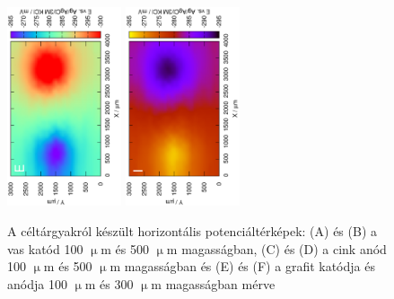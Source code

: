 \begin{figure}
\includegraphics[width=0.3\textwidth, angle=-90]{img/mérések/grafit_h1_100.eps}
\includegraphics[width=0.3\textwidth, angle=-90]{img/mérések/grafit_h_300.eps}
\caption{A céltárgyakról készült horizontális potenciáltérképek:
(A) és (B) a vas katód 100 $\upmu$m és 500 $\upmu$m magasságban, (C) és (D) a cink anód 100 $\upmu$m és 500 $\upmu$m magasságban és (E) és (F) a grafit katódja és anódja 100 $\upmu$m és 300 $\upmu$m magasságban mérve}
\label{fig:horizontális}
\end{figure}

